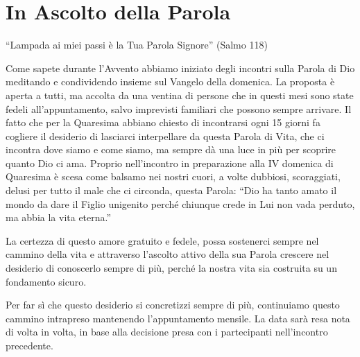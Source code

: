 \section{In Ascolto della Parola}
``Lampada ai miei passi è la Tua Parola Signore'' (Salmo 118)

Come sapete durante l’Avvento abbiamo iniziato degli incontri sulla Parola di Dio meditando e condividendo insieme sul Vangelo della domenica. La proposta è aperta a tutti, ma accolta da una ventina di persone che in questi mesi sono state fedeli all’appuntamento, salvo imprevisti familiari che possono sempre arrivare. Il fatto che per la Quaresima abbiano chiesto di incontrarsi ogni 15 giorni fa cogliere il desiderio di lasciarci interpellare da questa Parola di Vita, che ci incontra dove siamo e come siamo, ma sempre dà una luce in più per scoprire quanto Dio ci ama. Proprio nell’incontro in preparazione alla IV domenica di Quaresima è scesa come balsamo nei nostri cuori, a volte dubbiosi, scoraggiati, delusi per tutto il male che ci circonda, questa Parola: ``Dio ha tanto amato il mondo da dare il Figlio unigenito perché chiunque crede in Lui non vada perduto, ma abbia la vita eterna.''

La certezza di questo amore gratuito e fedele, possa sostenerci sempre nel cammino della vita e attraverso l’ascolto attivo della sua Parola crescere nel desiderio di conoscerlo sempre di più, perché la nostra vita sia costruita su un fondamento sicuro.

Per far sì che questo desiderio si concretizzi sempre di più, continuiamo questo cammino intrapreso mantenendo l’appuntamento mensile. La data sarà resa nota di volta in volta, in base alla decisione presa con i partecipanti nell’incontro precedente.

